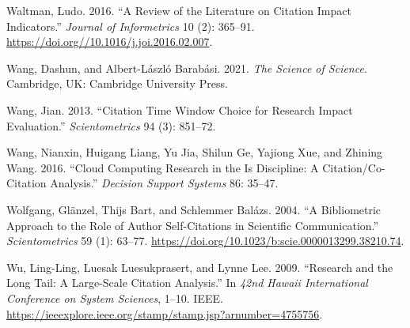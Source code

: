 \documentclass{article}
\begin{document}
\leavevmode\hypertarget{ref-waltman16:review}{}%
Waltman, Ludo. 2016. ``A Review of the Literature on Citation Impact Indicators.'' \emph{Journal of Informetrics} 10 (2): 365--91. \url{https://doi.org//10.1016/j.joi.2016.02.007}.

\leavevmode\hypertarget{ref-wang21:science}{}%
Wang, Dashun, and Albert-László Barabási. 2021. \emph{The Science of Science}. Cambridge, UK: Cambridge University Press.

\leavevmode\hypertarget{ref-wang13:citation}{}%
Wang, Jian. 2013. ``Citation Time Window Choice for Research Impact Evaluation.'' \emph{Scientometrics} 94 (3): 851--72.

\leavevmode\hypertarget{ref-wang16:cloud}{}%
Wang, Nianxin, Huigang Liang, Yu Jia, Shilun Ge, Yajiong Xue, and Zhining Wang. 2016. ``Cloud Computing Research in the Is Discipline: A Citation/Co-Citation Analysis.'' \emph{Decision Support Systems} 86: 35--47.

\leavevmode\hypertarget{ref-wolfgang04:bibliometric}{}%
Wolfgang, Glänzel, Thijs Bart, and Schlemmer Balázs. 2004. ``A Bibliometric Approach to the Role of Author Self-Citations in Scientific Communication.'' \emph{Scientometrics} 59 (1): 63--77. \url{https://doi.org/10.1023/b:scie.0000013299.38210.74}.

\leavevmode\hypertarget{ref-wu09:research}{}%
Wu, Ling-Ling, Luesak Luesukprasert, and Lynne Lee. 2009. ``Research and the Long Tail: A Large-Scale Citation Analysis.'' In \emph{42nd Hawaii International Conference on System Sciences}, 1--10. IEEE. \url{https://ieeexplore.ieee.org/stamp/stamp.jsp?arnumber=4755756}.


\end{document}
